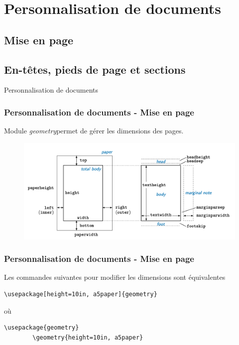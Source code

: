 
\section{Personnalisation de documents}

\subsection{Mise en page}

\subsection{En-têtes, pieds de page et sections}

\begin{frame}
    \vfill
    \begin{center}
        \large
        Personnalisation de documents
    \end{center}
    \vfill
\end{frame}

\begin{frame}
    \frametitle{Personnalisation de documents - Mise en page}
    Module \textcolor{hard_green}{\textit{geometry}}\footnotemark permet de gérer les dimensions des pages.
    \begin{figure}
        \centering
            \includegraphics[scale=0.35]{./figures/geometry.png}
            \label{fig: geometry}
    \end{figure}
\end{frame}

\begin{frame}[fragile]
    \frametitle{Personnalisation de documents - Mise en page}
    Les commandes suivantes pour modifier les dimensions sont équivalentes
    \vfill
    \begin{lstlisting}[xleftmargin=-10mm]
        \usepackage[height=10in, a5paper]{geometry}
    \end{lstlisting}
    \vfill
    \centering
    où
    \vfill
    \begin{lstlisting}[xleftmargin=-10mm]
        \usepackage{geometry}
        \geometry{height=10in, a5paper}
    \end{lstlisting}
\end{frame}

